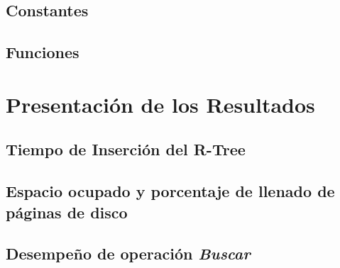 \documentclass[letterpaper,10pt]{article}
\begin{document}
	\subsection{Constantes}

	\subsection{Funciones}

	\newpage

	\section{Presentación de los Resultados}

	\subsection{Tiempo de Inserción del R-Tree}

	\newpage

	\subsection{Espacio ocupado y porcentaje de llenado de páginas de disco}

	\newpage

	\subsection{Desempeño de operación \textit{Buscar}}
\end{document}
